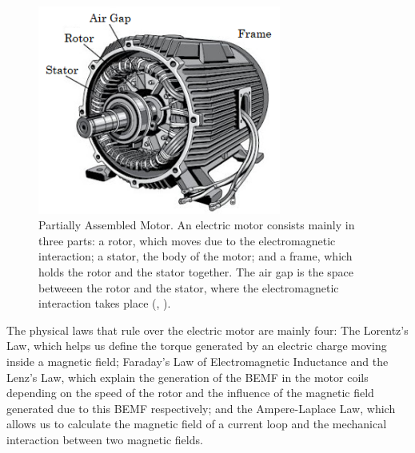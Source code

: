 \begin{figure}[htbp]
\centering
\includegraphics[width=8cm]{Images/motor_assembly.png} 
\caption[Partially Assembled Motor]{Partially Assembled Motor. An electric motor consists mainly in three parts: a rotor, which moves due to the electromagnetic interaction; a stator, the body of the motor; and a frame, which holds the rotor and the stator together. The air gap is the space betweeen the rotor and the stator, where the electromagnetic interaction takes place (, \citeyear{basic_components}).}
\label{fig:motor_assembly}
\end{figure}

The physical laws that rule over the electric motor are mainly four: The Lorentz’s Law, which helps us define the torque generated by an electric charge moving inside a magnetic field; Faraday’s Law of Electromagnetic Inductance and the Lenz’s Law, which explain the generation of the \acf{BEMF} in the motor coils depending on the speed of the rotor and the influence of the magnetic field generated due to this BEMF respectively; and the Ampere-Laplace Law, which allows us to calculate the magnetic field of a current loop and the mechanical interaction between two magnetic fields.

